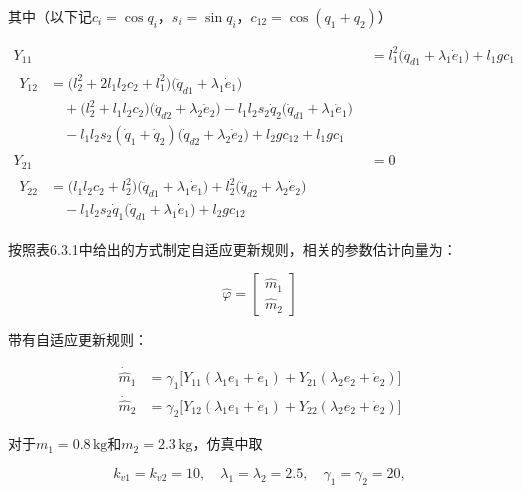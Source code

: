 \documentclass[12pt,a4paper]{ctexart}
\begin{document}
其中（以下记$c_i=\cos q_i$，$s_i=\sin q_i$，$c_{12}=\cos(q_1+q_2)$）

\begin{align}
Y_{11} &= l_1^2\bigl(\ddot{q}_{d1} + \lambda_1 \dot{e}_1\bigr) + l_1 g c_1 \tag{4} \\
\begin{split}
Y_{12} &= \bigl(l_2^2 + 2l_1 l_2 c_2 + l_1^2\bigr)\bigl(\ddot{q}_{d1} + \lambda_1 \dot{e}_1\bigr) \\
&\quad + \bigl(l_2^2 + l_1 l_2 c_2\bigr)\bigl(\ddot{q}_{d2} + \lambda_2 \dot{e}_2\bigr) - l_1 l_2 s_2 \dot{q}_2 \bigl(\dot{q}_{d1} + \lambda_1 \dot{e}_1\bigr) \\
&\quad - l_1 l_2 s_2 (\dot{q}_1 + \dot{q}_2)\bigl(\dot{q}_{d2} + \lambda_2 \dot{e}_2\bigr) + l_2 g c_{12} + l_1 g c_1
\end{split} \tag{5} \\
Y_{21} &= 0 \tag{6} \\
\begin{split}
Y_{22} &= \bigl(l_1 l_2 c_2 + l_2^2\bigr)\bigl(\ddot{q}_{d1} + \lambda_1 \dot{e}_1\bigr) + l_2^2\bigl(\ddot{q}_{d2} + \lambda_2 \dot{e}_2\bigr) \\
&\quad - l_1 l_2 s_2 \dot{q}_1 \bigl(\dot{q}_{d1} + \lambda_1 \dot{e}_1\bigr) + l_2 g c_{12}
\end{split} \tag{7}
\end{align}

按照表6.3.1中给出的方式制定自适应更新规则，相关的参数估计向量为：

\begin{equation*}
\hat{\varphi} = \begin{bmatrix} \hat{m}_1 \\ \hat{m}_2 \end{bmatrix}
\end{equation*}

带有自适应更新规则：

\begin{align}
\dot{\hat{m}}_1 &= \gamma_1 \bigl[ Y_{11}(\lambda_1 e_1 + \dot{e}_1) + Y_{21}(\lambda_2 e_2 + \dot{e}_2) \bigr] \tag{8} \\
\dot{\hat{m}}_2 &= \gamma_2 \bigl[ Y_{12}(\lambda_1 e_1 + \dot{e}_1) + Y_{22}(\lambda_2 e_2 + \dot{e}_2) \bigr] \tag{9}
\end{align}

对于$m_1 = 0.8\,\mathrm{kg}$和$m_2 = 2.3\,\mathrm{kg}$，仿真中取

\begin{equation}\tag{10}
k_{v1}=k_{v2}=10,\quad \lambda_1=\lambda_2=2.5,\quad \gamma_1=\gamma_2=20,
\end{equation}
\end{document}

